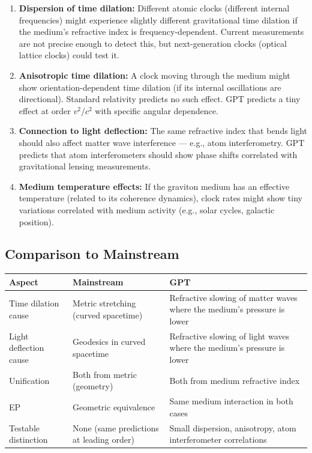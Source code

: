 \documentclass[12pt, a4paper]{article}
\begin{document}
\begin{enumerate}
    \item \textbf{Dispersion of time dilation:} Different atomic clocks (different internal frequencies) might experience slightly different gravitational time dilation if the medium's refractive index is frequency-dependent. Current measurements are not precise enough to detect this, but next-generation clocks (optical lattice clocks) could test it.
    
    \item \textbf{Anisotropic time dilation:} A clock moving through the medium might show orientation-dependent time dilation (if its internal oscillations are directional). Standard relativity predicts no such effect. GPT predicts a tiny effect at order \( v^2/c^2 \) with specific angular dependence.
    
    \item \textbf{Connection to light deflection:} The same refractive index that bends light should also affect matter wave interference — e.g., atom interferometry. GPT predicts that atom interferometers should show phase shifts correlated with gravitational lensing measurements.
    
    \item \textbf{Medium temperature effects:} If the graviton medium has an effective temperature (related to its coherence dynamics), clock rates might show tiny variations correlated with medium activity (e.g., solar cycles, galactic position).
\end{enumerate}

\subsection{Comparison to Mainstream}
\label{subsec:time_wave_comparison}

\begin{center}
\begin{tabular}{|p{3.5cm}|p{5cm}|p{5cm}|}
\hline
\textbf{Aspect} & \textbf{Mainstream} & \textbf{GPT} \\
\hline
Time dilation cause & Metric stretching (curved spacetime) & Refractive slowing of matter waves where the medium's pressure is lower \\
\hline
Light deflection cause & Geodesics in curved spacetime & Refractive slowing of light waves where the medium's pressure is lower \\
\hline
Unification & Both from metric (geometry) & Both from medium refractive index \\
\hline
EP & Geometric equivalence & Same medium interaction in both cases \\
\hline
Testable distinction & None (same predictions at leading order) & Small dispersion, anisotropy, atom interferometer correlations \\
\hline
\end{tabular}
\end{center}
\end{document}
